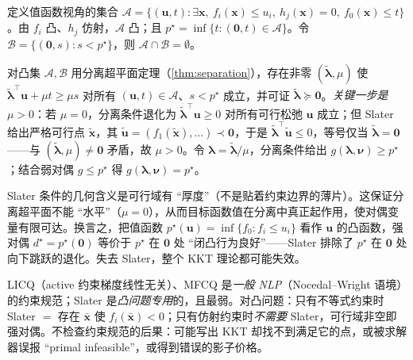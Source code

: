 \begin{derivation}[强对偶的几何证明骨架]
定义值函数视角的集合 $\mathcal A=\{(\mathbf u,t):\exists\mathbf x,\ f_i(\mathbf x)\le u_i,\ h_j(\mathbf x)=0,\ f_0(\mathbf x)\le t\}$。由 $f_i$ 凸、$h_j$ 仿射，$\mathcal A$ 凸；且 $p^\star=\inf\{t:(\mathbf 0,t)\in\mathcal A\}$。令 $\mathcal B=\{(\mathbf 0,s):s<p^\star\}$，则 $\mathcal A\cap\mathcal B=\emptyset$。

对凸集 $\mathcal A,\mathcal B$ 用分离超平面定理（\cref{thm:separation}），存在非零 $(\tilde{\boldsymbol\lambda},\mu)$ 使 $\tilde{\boldsymbol\lambda}^\top\mathbf u+\mu t\ge\mu s$ 对所有 $(\mathbf u,t)\in\mathcal A$、$s<p^\star$ 成立，并可证 $\tilde{\boldsymbol\lambda}\succeq\mathbf 0$。\emph{关键一步是 $\mu>0$}：若 $\mu=0$，分离条件退化为 $\tilde{\boldsymbol\lambda}^\top\mathbf u\ge0$ 对所有可行松弛 $\mathbf u$ 成立；但 Slater 给出严格可行点 $\tilde{\mathbf x}$，其 $\tilde{\mathbf u}=(f_1(\tilde{\mathbf x}),\dots)\prec\mathbf 0$，于是 $\tilde{\boldsymbol\lambda}^\top\tilde{\mathbf u}\le0$，等号仅当 $\tilde{\boldsymbol\lambda}=\mathbf 0$——与 $(\tilde{\boldsymbol\lambda},\mu)\neq\mathbf 0$ 矛盾，故 $\mu>0$。令 $\boldsymbol\lambda=\tilde{\boldsymbol\lambda}/\mu$，分离条件给出 $g(\boldsymbol\lambda,\boldsymbol\nu)\ge p^\star$；结合弱对偶 $g\le p^\star$ 得 $g(\boldsymbol\lambda,\boldsymbol\nu)=p^\star$。
\end{derivation}

\begin{insight}\label{ins:slater-thickness}
Slater 条件的几何含义是可行域有 “厚度”（不是贴着约束边界的薄片）。这保证分离超平面不能 “水平”（$\mu=0$），从而目标函数值在分离中真正起作用，使对偶变量有限可达。换言之，把值函数 $p^\star(\mathbf u)=\inf\{f_0:f_i\le u_i\}$ 看作 $\mathbf u$ 的凸函数，强对偶 $d^\star=p^\star(\mathbf 0)$ 等价于 $p^\star$ 在 $\mathbf 0$ 处 “闭凸行为良好”——Slater 排除了 $p^\star$ 在 $\mathbf 0$ 处向下跳跃的退化。失去 Slater，整个 KKT 理论都可能失效。
\end{insight}

\begin{pitfall}
LICQ（active 约束梯度线性无关）、MFCQ 是\emph{一般 NLP}（Nocedal--Wright 语境）的约束规范；Slater 是\emph{凸问题专用}的，且最弱。对凸问题：只有不等式约束时 Slater $=$ 存在 $\bar{\mathbf x}$ 使 $f_i(\bar{\mathbf x})<0$；只有仿射约束时\emph{不需要} Slater，可行域非空即强对偶。不检查约束规范的后果：可能写出 KKT 却找不到满足它的点，或被求解器误报 “primal infeasible”，或得到错误的影子价格。
\end{pitfall}

